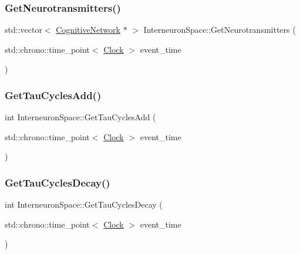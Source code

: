 \mbox{\label{classInterneuronSpace_aaae45b76a4c059aae1e27bde3901371c}} 
\subsubsection{\texorpdfstring{Get\+Neurotransmitters()}{GetNeurotransmitters()}}
{\footnotesize\ttfamily std\+::vector$<$ \mbox{\hyperlink{classCognitiveNetwork}{Cognitive\+Network}} $\ast$ $>$ Interneuron\+Space\+::\+Get\+Neurotransmitters (\begin{DoxyParamCaption}\item[{std\+::chrono\+::time\+\_\+point$<$ \mbox{\hyperlink{universe_8h_a0ef8d951d1ca5ab3cfaf7ab4c7a6fd80}{Clock}} $>$}]{event\+\_\+time }\end{DoxyParamCaption})}

\mbox{\label{classInterneuronSpace_abd37d409a97acca62d11576314bdfcf4}} 
\subsubsection{\texorpdfstring{Get\+Tau\+Cycles\+Add()}{GetTauCyclesAdd()}}
{\footnotesize\ttfamily int Interneuron\+Space\+::\+Get\+Tau\+Cycles\+Add (\begin{DoxyParamCaption}\item[{std\+::chrono\+::time\+\_\+point$<$ \mbox{\hyperlink{universe_8h_a0ef8d951d1ca5ab3cfaf7ab4c7a6fd80}{Clock}} $>$}]{event\+\_\+time }\end{DoxyParamCaption})\hspace{0.3cm}{\ttfamily [inline]}}

\mbox{\label{classInterneuronSpace_a1024eadca0b56be9b54593ea47c5879f}} 
\subsubsection{\texorpdfstring{Get\+Tau\+Cycles\+Decay()}{GetTauCyclesDecay()}}
{\footnotesize\ttfamily int Interneuron\+Space\+::\+Get\+Tau\+Cycles\+Decay (\begin{DoxyParamCaption}\item[{std\+::chrono\+::time\+\_\+point$<$ \mbox{\hyperlink{universe_8h_a0ef8d951d1ca5ab3cfaf7ab4c7a6fd80}{Clock}} $>$}]{event\+\_\+time }\end{DoxyParamCaption})\hspace{0.3cm}{\ttfamily [inline]}}

